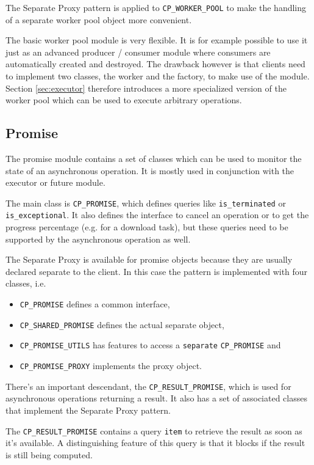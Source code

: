 The Separate Proxy pattern  is applied to \lstinline!CP_WORKER_POOL! to make the handling of a separate worker pool object more convenient.

The basic worker pool module is very flexible.
It is for example possible to use it just as an advanced producer / consumer module where consumers are automatically created and destroyed.
The drawback however is that clients need to implement two classes, the worker and the factory, to make use of the module.
Section \ref{sec:executor} therefore introduces a more specialized version of the worker pool which can be used to execute arbitrary operations.

\subsection{Promise}
\label {sec:promise}

The promise module contains a set of classes which can be used to monitor the state of an asynchronous operation.
It is mostly used in conjunction with the executor or future module.

The main class is \lstinline!CP_PROMISE!, which defines queries like \lstinline!is_terminated! or \lstinline!is_exceptional!.
It also defines the interface to cancel an operation or to get the progress percentage (e.g. for a download task), but these queries need to be supported by the asynchronous operation as well.

The Separate Proxy  is available for promise objects because they are usually declared separate to the client.
In this case the pattern is implemented with four classes, i.e.
\begin{itemize}
 \item \lstinline!CP_PROMISE! defines a common interface,
 \item \lstinline!CP_SHARED_PROMISE! defines the actual separate object,
 \item \lstinline!CP_PROMISE_UTILS! has features to access a \lstinline!separate! \lstinline!CP_PROMISE! and
 \item \lstinline!CP_PROMISE_PROXY! implements the proxy object.
\end{itemize}

There's an important descendant, the \lstinline!CP_RESULT_PROMISE!, which is used for asynchronous operations returning a result.
It also has a set of associated classes that implement the Separate Proxy pattern.

The \lstinline!CP_RESULT_PROMISE! contains a query \lstinline!item! to retrieve the result as soon as it's available.
A distinguishing feature of this query is that it blocks if the result is still being computed.

